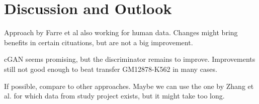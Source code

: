 \section{Discussion and Outlook}
Approach by Farre et al also working for human data.
Changes might bring benefits in certain cituations, but are not a big improvement.

cGAN seems promising, but the discriminator remains to improve.
Improvements still not good enough to beat transfer GM12878-K562 in many cases.

If possible, compare to other approaches. 
Maybe we can use the one by Zhang et al. for which data from study project exists, but it might take too long.
